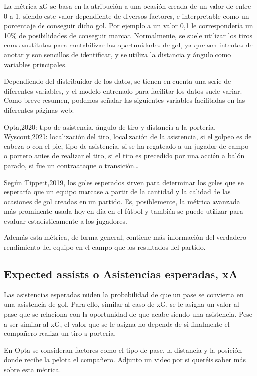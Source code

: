 La métrica xG se basa en la atribución a una ocasión creada de 
un valor de entre 0 a 1, siendo este valor dependiente de diversos 
factores, e interpretable como un porcentaje de conseguir dicho gol. 
Por ejemplo a un valor 0,1 le correspondería un 10\% de posibilidades 
de conseguir marcar. Normalmente, se suele utilizar los tiros 
como sustitutos para contabilizar las oportunidades de gol, 
ya que son intentos de anotar y son sencillos de identificar, 
y se utiliza la distancia y ángulo como variables principales.

Dependiendo del distribuidor de los datos, se tienen en cuenta una 
serie de diferentes variables, y el modelo entrenado para 
facilitar los datos suele variar. Como breve resumen, podemos 
señalar las siguientes variables facilitadas en las diferentes páginas web:

Opta,2020: tipo de asistencia, ángulo de tiro y distancia a la portería.
Wyscout,2020: localización del tiro, localización de la asistencia, 
si el golpeo es de cabeza o con el pie, tipo de asistencia, si se 
ha regateado a un jugador de campo o portero antes de realizar 
el tiro, si el tiro es precedido por una acción a balón parado, 
si fue un contraataque o transición…

Según Tippett,2019, los goles esperados sirven para determinar 
los goles que se esperaría que un equipo marcase a partir de 
la cantidad y la calidad de las ocasiones de gol creadas en un 
partido. Es, posiblemente, la métrica avanzada más prominente 
usada hoy en día en el fútbol y también se puede utilizar para 
evaluar estadísticamente a los jugadores.

Además esta métrica, de forma general, contiene más información 
del verdadero rendimiento del equipo en el campo que los 
resultados del partido.

\subsection{Expected assists o Asistencias esperadas, xA}
Las asistencias esperadas miden la probabilidad de que un pase se 
convierta en una asistencia de gol. Para ello, similar al caso de xG, 
se le asigna un valor al pase que se relaciona con la oportunidad 
de que acabe siendo una asistencia. Pese a ser similar al xG, el 
valor que se le asigna no depende de si finalmente el compañero 
realiza un tiro a portería.

En Opta se consideran factores como el tipo de pase, la distancia 
y la posición donde recibe la pelota el compañero. Adjunto un 
video por si queréis saber más sobre esta métrica.

